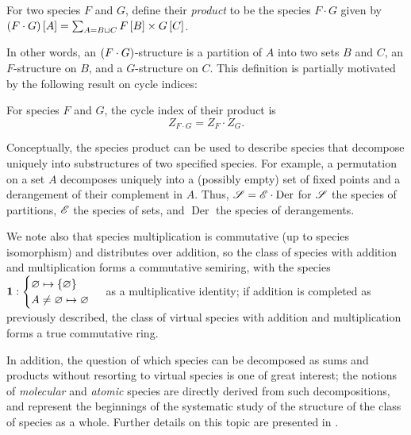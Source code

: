 \documentclass[sectionflow,singlespace,twoside,boldmathhdr]{brandiss} %
\numberwithin{section}{chapter}
\numberwithin{figure}{chapter}
\begin{document}
\begin{definition}\label{thm:specprod}
  For two species $F$ and $G$, define their \emph{product} to be the species $F \cdot G$ given by $\left( {F \cdot G} \right) \left[ {A} \right] = \sum_{A = B \sqcup C} F \left[ {B} \right] \times G \left[ {C} \right]$.
\end{definition}
In other words, an $\left( {F \cdot G} \right)$-structure is a partition of $A$ into two sets $B$ and $C$, an $F$-structure on $B$, and a $G$-structure on $C$.
This definition is partially motivated by the following result on cycle indices:
\begin{theorem}\label{thm:specprodci}
  For species $F$ and $G$, the cycle index of their product is
  \begin{equation}
    \label{eq:specprodci}
    Z_{F \cdot G} = Z_{F} \cdot Z_{G}.
  \end{equation}
\end{theorem}

Conceptually, the species product can be used to describe species that decompose uniquely into substructures of two specified species.
For example, a permutation on a set $A$ decomposes uniquely into a (possibly empty) set of fixed points and a derangement of their complement in $A$.
Thus, $\mathscr{S} = \mathscr{E} \cdot \operatorname{Der}$ for $\mathscr{S}$ the species of partitions, $\mathscr{E}$ the species of sets, and $\operatorname{Der}$ the species of derangements.

We note also that species multiplication is commutative (up to species isomorphism) and distributes over addition, so the class of species with addition and multiplication forms a commutative semiring, with the species $\mathbf{1}: \begin{cases} \varnothing \mapsto \left\{ {\varnothing} \right\} \\ A \neq \varnothing \mapsto \varnothing \end{cases}$ as a multiplicative identity; if addition is completed as previously described, the class of virtual species with addition and multiplication forms a true commutative ring.

In addition, the question of which species can be decomposed as sums and products without resorting to virtual species is one of great interest; the notions of \emph{molecular} and \emph{atomic} species are directly derived from such decompositions, and represent the beginnings of the systematic study of the structure of the class of species as a whole.
Further details on this topic are presented in \cite[\S 2.6]{bll:species}.
\end{document}
